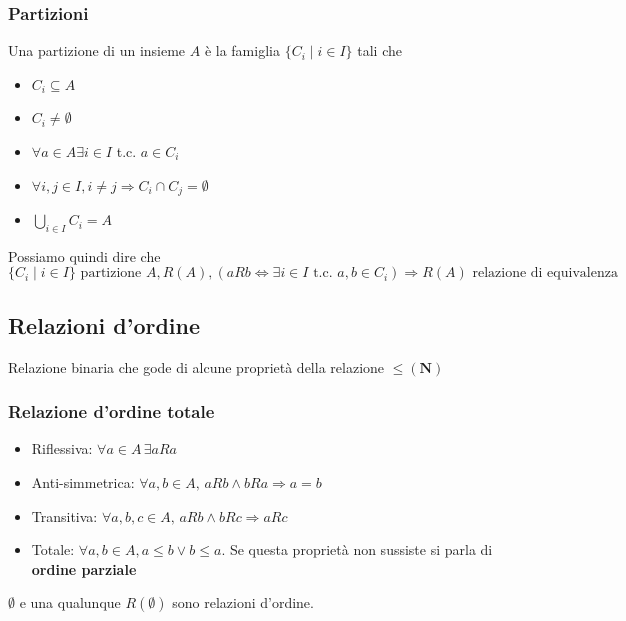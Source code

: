 \documentclass{report}
\begin{document}
        \subsubsection{Partizioni}
            Una partizione di un insieme $A$ è la famiglia $\{C_i \mid i \in I\}$ tali che
            \begin{itemize}
                \item $C_i \subseteq A$
                \item $C_i \neq \emptyset$
                \item $\forall a \in A \exists i \in I$ t.c. $a \in C_i$
                \item $\forall i, j \in I, i \neq j \Longrightarrow C_i \cap C_j = \emptyset$
                \item $\bigcup_{i \in I} C_i = A$
            \end{itemize}
            Possiamo quindi dire che
            $$\{C_i \mid i \in I\} \textrm{ partizione } A, R\left(A\right), 
                \left(aRb \Longleftrightarrow \exists i \in I \textrm{ t.c. } a, b \in C_i\right)
                \Longrightarrow R\left(A\right) \textrm{ relazione di equivalenza}
            $$
    \subsection{Relazioni d'ordine}
        Relazione binaria che gode di alcune proprietà della relazione $\leq\left(\mathbf{N}\right)$
        \subsubsection{Relazione d'ordine totale}
            \begin{itemize}
                \item Riflessiva: $\forall a \in A \, \exists aRa$
                \item Anti-simmetrica: $\forall a, b \in A, \, aRb \wedge bRa \Longrightarrow a = b$
                \item Transitiva: $\forall a,b,c \in A, \, aRb \wedge bRc \Longrightarrow aRc$
                \item Totale: $\forall a, b \in A, a \leq b \vee b \leq a$. Se questa proprietà non sussiste si parla di \textbf{ordine parziale}
            \end{itemize}
        $\emptyset$ e una qualunque $R\left(\emptyset\right)$ sono relazioni d'ordine.
\end{document}
